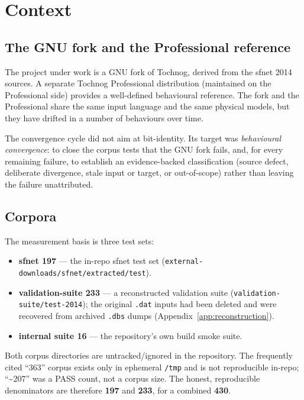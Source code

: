 \documentclass[11pt,a4paper]{report}
\newcommand{\code}[1]{\texttt{#1}}
\begin{document}
\chapter{Context}
\label{ch:context}

\section{The GNU fork and the Professional reference}

The project under work is a GNU fork of Tochnog, derived from the sfnet 2014
sources. A separate Tochnog Professional distribution (maintained on the
Professional side) provides a well-defined behavioural reference. The fork and
the Professional share the same input language and the same physical models, but
they have drifted in a number of behaviours over time.

The convergence cycle did not aim at bit-identity. Its target was
\emph{behavioural convergence}: to close the corpus tests that the GNU fork
fails, and, for every remaining failure, to establish an evidence-backed
classification (source defect, deliberate divergence, stale input or target, or
out-of-scope) rather than leaving the failure unattributed.

\section{Corpora}

The measurement basis is three test sets:

\begin{itemize}
  \item \textbf{sfnet 197} --- the in-repo sfnet test set
        (\code{external-downloads/\allowbreak sfnet/\allowbreak extracted/\allowbreak test}).
  \item \textbf{validation-suite 233} --- a reconstructed validation suite
        (\code{validation-suite/\allowbreak test-2014}); the original \code{.dat} inputs had
        been deleted and were recovered from archived \code{.dbs} dumps
        (Appendix~\ref{app:reconstruction}).
  \item \textbf{internal suite 16} --- the repository's own build smoke suite.
\end{itemize}

Both corpus directories are untracked/ignored in the repository. The frequently
cited ``363'' corpus exists only in ephemeral \code{/\allowbreak tmp} and is not reproducible
in-repo; ``\textasciitilde207'' was a PASS count, not a corpus size. The honest,
reproducible denominators are therefore \textbf{197} and \textbf{233}, for a
combined \textbf{430}.
\end{document}
